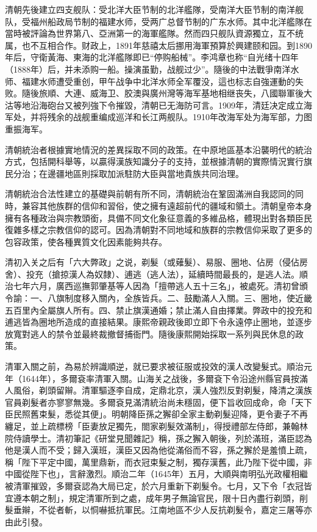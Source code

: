 清朝先後建立四支舰队：受北洋大臣节制的北洋艦隊，受南洋大臣节制的南洋舰队，受福州船政局节制的福建水师，受两广总督节制的广东水师。其中北洋艦隊在當時被評論為世界第八、亞洲第一的海軍艦隊。然而四只舰队資源獨立，互不统属，也不互相合作。财政上，1891年慈禧太后挪用海軍預算於興建颐和园。到1890年后，守衛黃海、東海的北洋艦隊即已“停购船械”。李鸿章也称“自光绪十四年（1888年）后，并未添购一船。操演虽勤，战舰过少”。隨後的中法戰爭南洋水师、福建水师遭受重创，甲午战争中北洋水师全军覆没，這也标志自強運動的失败。隨後旅順、大連、威海卫、胶澳與廣州灣等海军基地相继丧失，八國聯軍後大沽等地沿海砲台又被列強下令摧毀，清朝已无海防可言。1909年，清廷决定成立海军处，并将残余的战舰重编成巡洋和长江两舰队。1910年改海军处为海军部，力图重振海军。

清朝統治者根據實地情況的差異採取不同的政策。在中原地區基本沿襲明代的統治方式，包括開科舉等，以贏得漢族知識分子的支持，並根據清朝的實際情況實行旗民分治；在邊疆地區則採取加派駐防大臣與當地貴族共同治理。

清朝統治合法性建立的基礎與前朝有所不同，清朝統治在鞏固滿洲自我認同的同時，兼容其他族群的信仰和習俗，使之擁有遠超前代的疆域和領土。清朝皇帝本身擁有各種政治與宗教頭銜，具備不同文化象征意義的多維品格，體現出對各類臣民復雜多樣之宗教信仰的認可。因為清朝對不同地域和族群的宗教信仰采取了更多的包容政策，使各種異質文化因素能夠共存。

清初入关之后有「六大弊政」之说，剃髮（或薙髮）、易服、圈地、佔房（侵佔房舍）、投充（搶掠漢人為奴隸）、逋逃（逃人法），延續時間最長的，是逃人法。順治七年六月，廣西巡撫郭肇基等人因為「擅帶逃人五十三名」，被處死。清初曾頒令諭：一、八旗制度移入關內，全族皆兵。二、鼓勵滿人入關。三、圈地，使近畿五百里內全屬旗人所有。四、禁止旗漢通婚；禁止滿人自由擇業。弊政中的投充和逋逃皆為圈地所造成的直接結果。康熙帝親政後即立即下令永遠停止圈地，並逐步放寬對逃人的禁令並最終裁撤督捕衙門。隨後康熙開始採取一系列與民休息的政策。

清軍入關之前，為易於辨識順逆，就已要求被征服或投效的漢人改變髮式。順治元年（1644年），多爾袞率清軍入關。山海关之战後，多爾袞下令沿途州縣官員按滿人風俗，剃頭留辮。清軍驅逐李自成，定鼎北京，漢人強烈反對剃髮，降清之漢族官員剃髮者亦寥寥無幾。多爾袞見滿清統治尚未穩固，便下旨收回成命，命「天下臣民照舊束髮，悉從其便」。明朝降臣孫之獬卻全家主動剃髮迎降，更令妻子不再纏足，並上疏標榜「臣妻放足獨先，閤家剃髮效滿制」，得授禮部左侍郎，兼翰林院侍讀學士。清初筆記《研堂見聞雜記》稱，孫之獬入朝後，列於滿班，滿臣認為他是漢人而不受；歸入漢班，漢臣又因為他從滿俗而不容，孫之獬於是羞憤上疏，稱「陛下平定中國，萬里鼎新，而衣冠束髮之制，獨存漢舊，此乃陛下從中國，非中國從陛下也」，言辭激烈。順治二年（1645年）五月，大順與南明弘光政權相繼被清軍摧毀，多爾袞認為大局已定，於六月重新下剃髮令。七月，又下令「衣冠皆宜遵本朝之制」，規定清軍所到之處，成年男子無論官民，限十日內盡行剃頭，削髮垂辮，不從者斬，以恫嚇抵抗軍民。江南地區不少人反抗剃髮令，嘉定三屠等亦由此引發。

